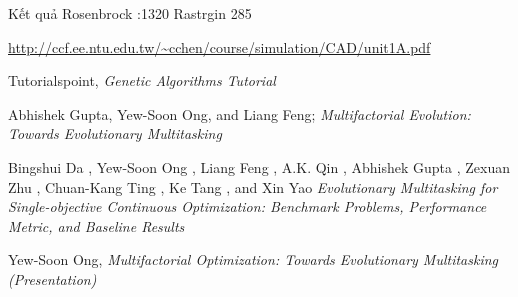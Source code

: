 \documentclass[a4paper,12pt]{report}
\begin{document}
Kết quả Rosenbrock :1320  Rastrgin 285
\begin{thebibliography}{9}
 \url{http://ccf.ee.ntu.edu.tw/~cchen/course/simulation/CAD/unit1A.pdf}

 Tutorialspoint, \textit{Genetic Algorithms Tutorial}

 Abhishek Gupta, Yew-Soon Ong, and Liang Feng; \textit{Multifactorial Evolution: Towards Evolutionary Multitasking}

Bingshui Da
, Yew-Soon Ong
, Liang Feng
, A.K. Qin
, Abhishek Gupta
,
Zexuan Zhu
, Chuan-Kang Ting
, Ke Tang
, and Xin Yao \textit{Evolutionary Multitasking for Single-objective
Continuous Optimization: Benchmark Problems,
Performance Metric, and Baseline Results
}


 Yew-Soon Ong, \textit{Multifactorial Optimization: Towards Evolutionary Multitasking (Presentation)} 
\end{thebibliography}
\end{document}
